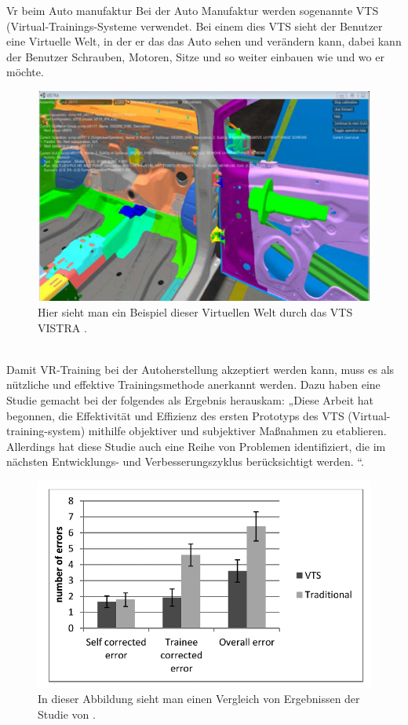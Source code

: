 Vr beim Auto manufaktur
Bei der Auto Manufaktur werden sogenannte VTS (Virtual-Trainings-Systeme verwendet. Bei einem dies VTS sieht der Benutzer eine Virtuelle Welt, in der er das das Auto sehen und verändern kann, dabei kann der Benutzer Schrauben, Motoren, Sitze und so weiter einbauen wie und wo er möchte.
\\
\begin{figure}[!ht]
    \centering
    \includegraphics[width=1.0\textwidth]{images/Abbildung 4.png}
    \caption{\label{fig:Abbildung 4}Hier sieht man ein Beispiel dieser Virtuellen Welt durch das VTS VISTRA \cite{langley2016establishing}.\protect
    }
\end{figure}
\\
Damit VR-Training bei der Autoherstellung akzeptiert werden kann, muss es als nützliche und effektive Trainingsmethode anerkannt werden. Dazu haben \cite{langley2016establishing} eine Studie gemacht bei der folgendes als Ergebnis herauskam: „Diese Arbeit hat begonnen, die Effektivität und Effizienz des ersten Prototyps des VTS (Virtual-training-system) mithilfe objektiver und subjektiver Maßnahmen zu etablieren. Allerdings hat diese Studie auch eine Reihe von Problemen identifiziert, die im nächsten Entwicklungs- und Verbesserungszyklus berücksichtigt werden. \cite{langley2016establishing} “.
\\
\begin{figure}[!ht]
    \centering
    \includegraphics[width=1.0\textwidth]{images/Abbildung 5.png}
    \caption{\label{fig:Abbildung 5}In dieser Abbildung sieht man einen Vergleich von Ergebnissen der Studie von \cite{langley2016establishing}.\protect
    }
\end{figure}
